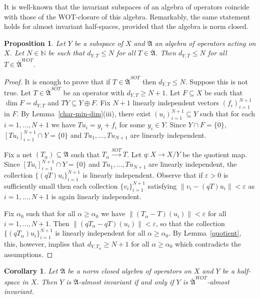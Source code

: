\documentclass[12pt]{amsart}
\theoremstyle{plain}
\newtheorem{corollary}[theorem]{Corollary}
\newtheorem{proposition}[theorem]{Proposition}
\theoremstyle{definition}
\theoremstyle{remark}
\begin{document}
It is well-known that the invariant subspaces of an algebra of operators coincide with those of the WOT-closure of this algebra. Remarkably, the same statement holds for almost invariant half-spaces, provided that the algebra is norm closed.

\begin{proposition}\label{WOT-closure}
Let $Y$ be a subspace of $X$ and $\mathfrak A$ an algebra of operators acting on $X$. Let $N\in\mathbb N$ be such that $d_{Y,T}{\leqslant} N$ for all $T\in\mathfrak A$. Then $d_{Y,T}{\leqslant} N$ for all $T\in\overline{\mathfrak A}^{WOT}$.
\end{proposition}

\begin{proof}
It is enough to prove that if $T\in\overline{\mathfrak A}^{SOT}$ then $d_{Y,T}{\leqslant} N$. Suppose this is not true. Let $T\in\overline{\mathfrak A}^{SOT}$ be an operator with $d_{Y,T}{\geqslant} N+1$. Let $F\subseteq X$ be such that $\dim F=d_{Y,T}$ and $TY\subseteq Y\oplus F$. Fix $N+1$ linearly independent vectors $(f_i)_{i=1}^{N+1}$ in $F$. By Lemma~\ref{char-min-dim}(iii), there exist $(u_i)_{i=1}^{N+1}\subseteq Y$ such that for each $i=1,\dots, N+1$ we have $Tu_i=y_i+f_i$ for some $y_i\in Y$. Since $Y\cap F=\{0\}$, $[Tu_i]_{i=1}^{N+1}\cap Y=\{0\}$ and $Tu_1,\dots,Tu_{N+1}$ are linearly independent.

Fix a net $(T_\alpha)\subseteq\mathfrak A$ such that $T_\alpha\overset{SOT}{\to} T$. Let $q:X\to X/Y$ be the quotient map. Since $[Tu_i]_{i=1}^{N+1}\cap Y=\{0\}$ and $Tu_1,\dots,Tu_{N+1}$ are linearly independent, the collection $\{(qT)u_i\}_{i=1}^{N+1}$ is linearly independent. Observe that if $\varepsilon>0$ is sufficiently small then each collection $\{v_i\}_{i=1}^{N+1}$ satisfying ${\lVert{v_i-(qT)u_i}\rVert}<\varepsilon$ as $i=1,\dots,N+1$ is again linearly independent.

Fix $\alpha_0$ such that for all $\alpha{\geqslant}\alpha_0$ we have ${\lVert{(T_\alpha-T)(u_i)}\rVert}<\varepsilon$ for all $i=1,\dots,N+1$. Then ${\lVert{(qT_\alpha-qT)(u_i)}\rVert}<\varepsilon$, so that the collection $\{(qT_\alpha)u_i\}_{i=1}^{N+1}$ is linearly independent for all $\alpha{\geqslant}\alpha_0$. By Lemma~\ref{quotient}, this, however, implies that $d_{Y,T_\alpha}{\geqslant} N+1$ for all $\alpha{\geqslant}\alpha_0$ which contradicts the assumptions.
\end{proof}

\begin{corollary}\label{A-iff-WOT-A}
Let $\mathfrak A$ be a norm closed algebra of operators on $X$ and $Y$ be a half-space in $X$. Then $Y$ is $\mathfrak A$-almost invariant if and only if $Y$ is $\overline{\mathfrak A}^{WOT}$-almost invariant.
\end{corollary}
\end{document}
